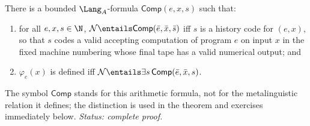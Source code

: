 \begin{theorem}
\label{thm:bounded-verification}
There is a bounded \(\Lang_A\)-formula \(\mathsf{Comp}(e,x,s)\) such that:
\begin{enumerate}[label=(\alph*)]
\item for all \(e,x,s\in\N\),
      \(\mathcal N\entails\mathsf{Comp}(\bar e,\bar x,\bar s)\) iff
      \(s\) is a history code for \((e,x)\), so that \(s\) codes a valid
      accepting computation of program \(e\) on input \(x\) in the fixed
      machine numbering whose final tape has a valid numerical output;
      and
\item \(\varphi_e(x)\) is defined iff
      \(\mathcal N\entails\exists s\,\mathsf{Comp}(\bar e,\bar x,s)\).
\end{enumerate}
The symbol \(\mathsf{Comp}\) stands
for this arithmetic formula, not for the metalinguistic relation it defines;
the distinction is used in the theorem and exercises immediately below.
\textit{Status: complete proof.}
\end{theorem}

